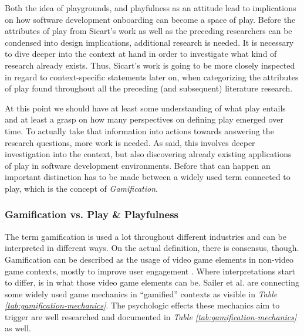 Both the idea of playgrounds, and playfulness as an attitude lead to implications on how software development onboarding can become a space of play. Before the attributes of play from Sicart's work as well as the preceding researchers can be condensed into design implications, additional research is needed. It is necessary to dive deeper into the context at hand in order to investigate what kind of research already exists. Thus, Sicart's work is going to be more closely inspected in regard to context-specific statements later on, when categorizing the attributes of play found throughout all the preceding (and subsequent) literature research.

At this point we should have at least some understanding of what play entails and at least a grasp on how many perspectives on defining play emerged over time. To actually take that information into actions towards answering the research questions, more work is needed. As said, this involves deeper investigation into the context, but also discovering already existing applications of play in software development environments. Before that can happen an important distinction has to be made between a widely used term connected to play, which is the concept of \textit{Gamification}.

\subsubsection{Gamification vs. Play \& Playfulness}

The term gamification is used a lot throughout different industries and can be interpreted in different ways. On the actual definition, there is consensus, though. Gamification can be described as the usage of video game elements in non-video game contexts, mostly to improve user engagement \cite{deterding2011gamification}. Where interpretations start to differ, is in what those video game elements can be. Sailer et al. are connecting some widely used game mechanics in \enquote{gamified} contexts as visible in \textit{Table \ref{tab:gamification-mechanics}}. The psychologic effects these mechanics aim to trigger are well researched and documented in \textit{Table \ref{tab:gamification-mechanics}} as well.

